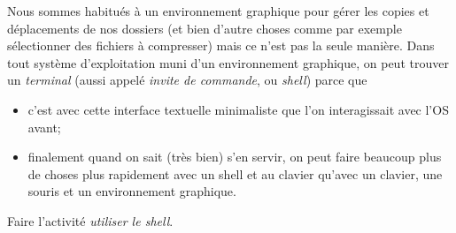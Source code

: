 	Nous sommes habitués à un environnement graphique pour gérer les copies et déplacements de nos dossiers (et bien d'autre choses comme par exemple sélectionner des fichiers à compresser) mais ce n'est pas la seule manière. Dans tout système d'exploitation muni d'un environnement graphique, on peut trouver un \textit{terminal} (aussi appelé \textit{invite de commande}, ou \textit{shell}) parce que
	\begin{itemize}
		\item 	c'est avec cette interface textuelle minimaliste que l'on interagissait avec l'\textsc{OS} avant;
		\item 	finalement quand on sait (très bien) s'en servir, on peut faire beaucoup plus de choses plus rapidement avec un shell et au clavier qu'avec un clavier, une souris et un environnement graphique.
	\end{itemize}

	\begin{exercice}[]
		Faire l'activité \textit{utiliser le shell}.
	\end{exercice}
	